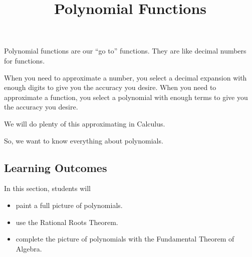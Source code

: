 \documentclass{ximera}
\title{Polynomial Functions}
\begin{document}
\begin{abstract}
\end{abstract}
\maketitle






Polynomial functions are our ``go to'' functions.  They are like decimal numbers for functions.  

When you need to approximate a number, you select a decimal expansion with enough digits to give you the accuracy you desire. When you need to approximate a function, you select a polynomial with enough terms to give you the accuracy you desire. 

We will do plenty of this approximating in Calculus.

So, we want to know everything about polynomials.
















\subsection{Learning Outcomes}

\begin{sectionOutcomes}
In this section, students will 

\begin{itemize}
\item paint a full picture of polynomials.
\item use the Rational Roots Theorem.
\item complete the picture of polynomials with the Fundamental Theorem of Algebra.
\end{itemize}
\end{sectionOutcomes}
\end{document}
